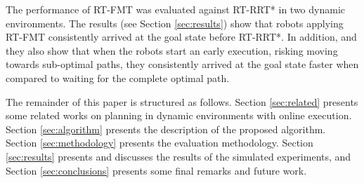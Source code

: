 The performance of RT-FMT was evaluated against RT-RRT* in two dynamic environments. The results (see Section \ref{sec:results}) show that robots applying RT-FMT consistently arrived at the goal state before RT-RRT*. In addition, and they also show that when the robots start an early execution, risking moving towards sub-optimal paths, they consistently arrived at the goal state faster when compared to waiting for the complete optimal path.

The remainder of this paper is structured as follows. Section \ref{sec:related} presents some related works on planning in dynamic environments with online execution. Section \ref{sec:algorithm} presents the description of the proposed algorithm. Section \ref{sec:methodology} presents the evaluation methodology. Section \ref{sec:results} presents and discusses the results of the simulated experiments, and Section \ref{sec:conclusions} presents some final remarks and future work.
